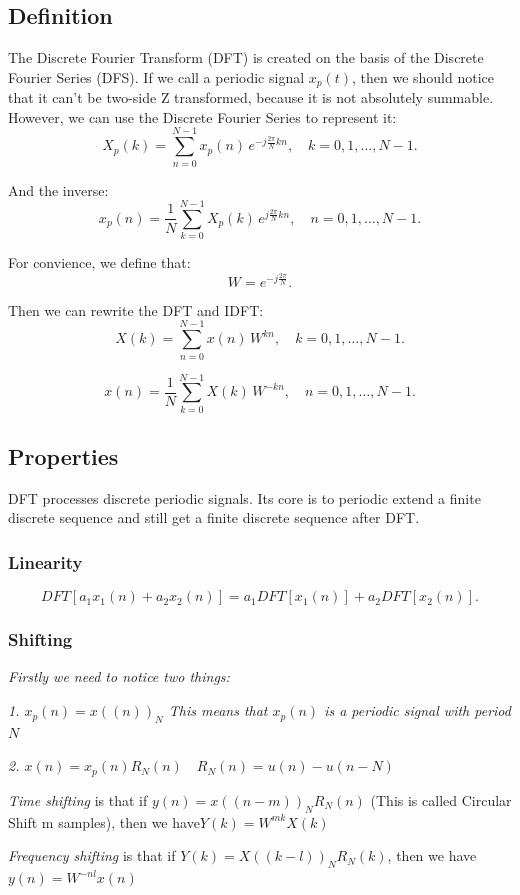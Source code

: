 \documentclass[10pt,a4paper,oneside,numbers=noenddot]{scrbook}
\theoremstyle{ctplain}
\theoremstyle{ctresult}
\begin{document}
\subsection{Definition}

The Discrete Fourier Transform (DFT) is created on the basis of the Discrete
Fourier Series (DFS). If we call a periodic signal $x_p(t)$, then we should notice
that it can't be two-side Z transformed, because it is not absolutely summable.
However, we can use the Discrete Fourier Series to represent it:
\[
  X_p(k) = \sum_{n=0}^{N-1} x_p(n)\,e^{-j\frac{2\pi}{N}kn},\quad k=0,1,\dots,N-1.
\]

And the inverse:
\[
  x_p(n) = \frac{1}{N}\sum_{k=0}^{N-1} X_p(k)\,e^{j\frac{2\pi}{N}kn},\quad n=0,1,
  \dots,N-1.
\]

For convience, we define that:
\[
  W = e^{-j\frac{2\pi}{N}}.
\]

Then we can rewrite the DFT and IDFT:
\[
  X(k) = \sum_{n=0}^{N-1} x(n)\,W^{kn},\quad k=0,1,\dots,N-1.
\]

\[
  x(n) = \frac{1}{N}\sum_{k=0}^{N-1} X(k)\,W^{-kn},\quad n=0,1,\dots,N-1.
\]

\subsection{Properties}

DFT processes discrete periodic signals. Its core is to periodic extend a finite
discrete sequence and still get a finite discrete sequence after DFT.

\subsubsection{Linearity}
\[
  DFT[a_1x_1(n) + a_2x_2(n)] = a_1DFT[x_1(n)] + a_2DFT[x_2(n)].
\]

\subsubsection{Shifting}
\textit{Firstly we need to notice two things:}

\textit{1. $x_p(n) = x((n))_N$ This means that $x_p(n)$ is a periodic signal with 
period $N$}

\textit{2. $x(n) = x_p(n)R_N(n) \quad R_N(n) = u(n) - u(n-N)$}

\emph{Time shifting} is that if $y(n) = x((n-m))_NR_N(n)$ (This is called Circular
Shift m samples), then we have$Y(k) = W^{mk}X(k)$

\emph{Frequency shifting} is that if $Y(k) = X((k-l))_NR_N(k)$, then we have
$y(n) = W^{-nl}x(n)$
\end{document}
